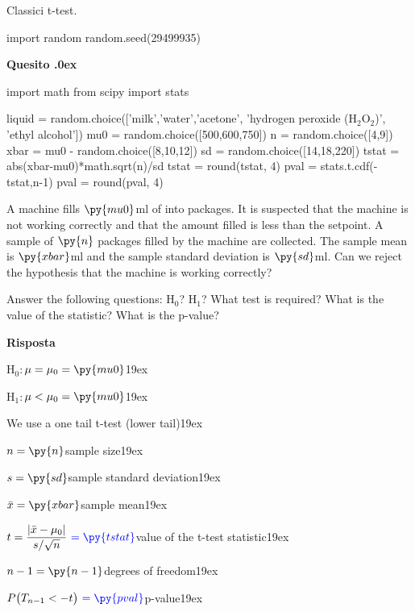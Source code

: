 \documentclass[11pt,twoside,a4paper]{article}
\newcounter{quesito}
\newenvironment{question}{\bigskip\addtocounter{quesito}{1}\bigskip\bigskip\par\textbf{Quesito \thequesito.\kern0ex}}{\par\vspace{\parskip}}
\newenvironment{answer}{\par\textbf{Risposta\quad}}{\par\vspace{\parskip}}
\begin{document}
\colorbox{blue!10}{\begin{minipage}{\textwidth}
Classici t-test.
\end{minipage}}

\bigskip\bigskip


\begin{pycode}
import random
random.seed(29499935)
\end{pycode}

\begin{question}
\begin{pycode}
import math
from scipy import stats

liquid = random.choice(['milk','water','acetone', 'hydrogen peroxide (H$_2$O$_2$)', 'ethyl alcohol'])
mu0 = random.choice([500,600,750])
n = random.choice([4,9])
xbar = mu0 - random.choice([8,10,12])
sd = random.choice([14,18,220])
tstat = abs(xbar-mu0)*math.sqrt(n)/sd
tstat = round(tstat, 4)
pval = stats.t.cdf(-tstat,n-1)
pval = round(pval, 4)
\end{pycode}
A machine fills $\py{mu0}$ml of  into packages. It is suspected that the machine is not working correctly and that the amount filled is less than the setpoint. A sample of $\py{n}$ packages filled by the machine are collected. The sample mean is $\py{xbar}$ml and the sample standard deviation is $\py{sd}$ml. Can we reject the hypothesis that the machine is working correctly?

Answer the following questions: H$_0$? H$_1$? What test is required? What is the value of the statistic? What is the p-value? 


\begin{answer}

  H$_0:$\hfill $\mu = \mu_0 = \py{mu0}$\kern19ex
  
  H$_1:$\hfill $\mu<\mu_0 = \py{mu0}$\kern19ex
  
  We use a one tail t-test (lower tail)\kern19ex
  
  $n = \py{n}$\hfill sample size\kern19ex
  
  $s = \py{sd}$\hfill sample standard deviation\kern19ex
  
  $\bar{x} = \py{xbar}$\hfill sample mean\kern19ex
  
  $t = \displaystyle\frac{|\bar{x}-\mu_0|}{s/\sqrt{n}}\ {\color{blue} = \py{tstat}}$\hfill value of the t-test statistic\kern19ex
  
  $n-1 = \py{n-1}$\hfill degrees of freedom\kern19ex
  
  $P\big(T_{n-1}<-t\big)\ {\color{blue} = \py{pval}}$\hfill p-value\kern19ex

\end{answer}
\end{question}
\end{document}
